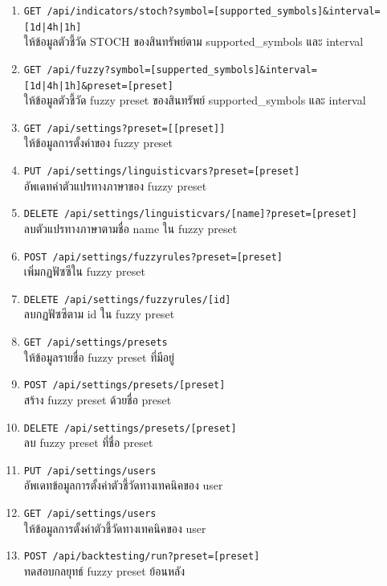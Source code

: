 \begin{enumerate}
    \item \texttt{GET {\footnotesize /api/indicators/stoch?symbol=[supported\_symbols]\&interval=[1d|4h|1h]}} \\ให้ข้อมูลตัวชี้วัด STOCH ของสินทรัพย์ตาม supported\_symbols และ interval
    \item \texttt{GET {\footnotesize /api/fuzzy?symbol=[supperted\_symbols]\&interval=[1d|4h|1h]\&preset=[preset]}} \\ให้ข้อมูลตัวชี้วัด fuzzy preset ของสินทรัพย์ supported\_symbols และ interval
    \item \texttt{GET {\footnotesize /api/settings?preset=[[preset]]}} \\ให้ข้อมูลการตั้งค่าของ fuzzy preset
    \item \texttt{PUT {\footnotesize /api/settings/linguisticvars?preset=[preset]}} \\อัพเดทค่าตัวแปรทางภาษาของ fuzzy preset
    \item \texttt{DELETE {\footnotesize /api/settings/linguisticvars/[name]?preset=[preset]}} \\ลบตัวแปรทางภาษาตามชื่อ name ใน fuzzy preset
    \item \texttt{POST {\footnotesize /api/settings/fuzzyrules?preset=[preset]}} \\เพิ่มกฏฟัซซีใน fuzzy preset
    \item \texttt{DELETE {\footnotesize /api/settings/fuzzyrules/[id]}} \\ลบกฏฟัซซีตาม id ใน fuzzy preset
    \item \texttt{GET {\footnotesize /api/settings/presets}} \\ให้ข้อมูลรายชื่อ fuzzy preset ที่มีอยู่
    \item \texttt{POST {\footnotesize /api/settings/presets/[preset]}} \\สร้าง fuzzy preset ด้วยชื่อ preset
    \item \texttt{DELETE {\footnotesize /api/settings/presets/[preset]}} \\ลบ fuzzy preset ที่ชื่อ preset
    \item \texttt{PUT {\footnotesize /api/settings/users}} \\อัพเดทข้อมูลการตั้งค่าตัวชี้วัดทางเทคนิคของ user
    \item \texttt{GET {\footnotesize /api/settings/users}} \\ให้ข้อมูลการตั้งค่าตัวชี้วัดทางเทคนิคของ user
    \item \texttt{POST {\footnotesize /api/backtesting/run?preset=[preset]}} \\ทดสอบกลยุทธ์ fuzzy preset ย้อนหลัง

\end{enumerate}
